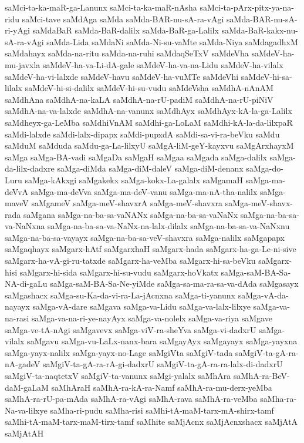 {saMci-ta-ka-maR-ga-Lanunx
saMci-ta-ka-maR-nAsha
saMci-ta-pArx-pitx-ya-na-ridu
saMci-tave
saMdAga
saMda
saMda-BAR-nu-sA-ra-vAgi
saMda-BAR-nu-sA-ri-yAgi
saMdaBaR
saMda-BaR-dalilx
saMda-BaR-ga-Lalilx
saMda-BaR-kakx-nu-sA-ra-vAgi
saMda-Lida
saMdaNi
saMda-Ni-su-vaMte
saMda-Niya
saMdagadhxM
saMdahayx
saMda-na-ritu
saMda-na-ruhi
saMdaqSeTxV
saMdeVha
saMdeV-ha-mu-javxla
saMdeV-ha-va-Li-dA-gale
saMdeV-ha-va-na-Lidu
saMdeV-ha-vilalx
saMdeV-ha-vi-lalxde
saMdeV-havu
saMdeV-ha-vuMTe
saMdeVhi
saMdeV-hi-sa-lilalx
saMdeV-hi-si-dalilx
saMdeV-hi-su-vudu
saMdeVsha
saMdhA-nAnAM
saMdhAna
saMdhA-na-kaLA
saMdhA-na-rU-padiM
saMdhA-na-rU-piNiV
saMdhA-na-va-lalxde
saMdhA-na-vanunx
saMdhAyx
saMdhAyx-kA-la-ga-Lalilx
saMdheyx-ga-LeMba
saMdhiVnAM
saMdhi-ga-LoLaM
saMdhi-kA-la-da-lilxpaR
saMdi-lalxde
saMdi-lalx-dipapx
saMdi-pupxdA
saMdi-sa-vi-ra-beVku
saMdu
saMduM
saMduda
saMdu-ga-La-lilxyU
saMgA-liM-geY-kayxvu
saMgArxhayxM
saMga
saMga-BA-vadi
saMgaDa
saMgaH
saMgaa
saMgada
saMga-dalilx
saMga-da-lilx-dadxre
saMga-diMda
saMga-diM-daleV
saMga-diM-denanx
saMga-do-Luru
saMga-kAkxgi
saMgakekx
saMga-kokx-La-galalx
saMgamaH
saMga-ma-deVvA
saMga-ma-deVva
saMga-ma-deV-vanu
saMga-ma-nA-tha-nalilx
saMga-maveV
saMgameV
saMga-meV-shavxrA
saMga-meV-shavxra
saMga-meV-shavx-rada
saMgana
saMga-na-ba-sa-vaNANx
saMga-na-ba-sa-vaNaNx
saMga-na-ba-sa-va-NaNxna
saMga-na-ba-sa-va-NaNx-na-lalx-dilalx
saMga-na-ba-sa-va-NaNxnu
saMga-na-ba-sa-vayayx
saMga-na-ba-sa-veV-shavxra
saMga-nalilx
saMgapapx
saMgaqhayx
saMgarx-hAtf
saMgarxhaH
saMgarx-hada
saMgarx-ha-ga-Le-ni-sive
saMgarx-ha-vA-gi-ru-tatxde
saMgarx-ha-veMba
saMgarx-hi-sa-beVku
saMgarx-hisi
saMgarx-hi-sida
saMgarx-hi-su-vudu
saMgarx-hoVkatx
saMga-saM-BA-Sa-NA-di-gaLu
saMga-saM-BA-Sa-Ne-yiMde
saMga-sa-ma-ra-sa-va-dAda
saMgasayx
saMgashacx
saMga-su-Ka-da-vi-ra-La-jAcnxna
saMga-ti-yanunx
saMga-vA-da-nayayx
saMga-vA-dare
saMgava
saMga-va-Lidu
saMga-va-lalx-lilxye
saMga-va-na-rasi
saMga-va-na-ri-ye-nayAyx
saMga-va-nolelx
saMga-va-riya
saMgave
saMga-ve-tA-nAgi
saMgavevx
saMga-viV-ra-sheYva
saMga-vi-dadxrU
saMga-vilalx
saMgavu
saMga-vu-LaLx-nanx-bara
saMgayAyx
saMgayayx
saMga-yayxna
saMga-yayx-nalilx
saMga-yayx-no-Lage
saMgiVta
saMgiV-tada
saMgiV-ta-gA-ra-nA-gadeV
saMgiV-ta-gA-ra-rA-gi-dadxrU
saMgiV-ta-gA-ra-ra-lalx-di-dadxrU
saMgiV-ta-naqtetxV
saMgiV-ta-vanunx
saMgi-yalalx
saMhAra
saMhA-ra-BeV-daM-gaLaM
saMhAraH
saMhA-ra-kA-ra-Namf
saMhA-ra-mu-derx-yeMba
saMhA-ra-rU-pa-mAda
saMhA-ra-vAgi
saMhA-rava
saMhA-ra-veMba
saMha-ra-Na-va-lilxye
saMha-ri-pudu
saMha-risi
saMhi-tA-maM-tarx-mA-shirx-tamf
saMhi-tA-maM-tarx-maM-tirx-tamf
saMhite
saMjAcnx
saMjAcnxshacx
saMjAtA
saMjAtAH
}
